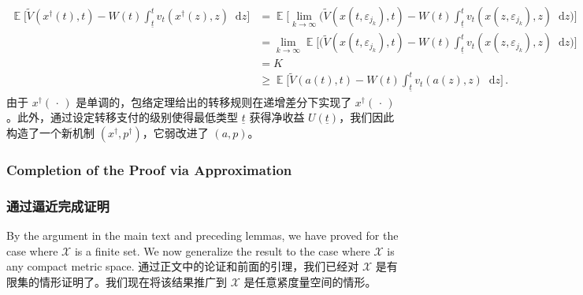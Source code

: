 \documentclass[12pt,letterpaper]{article}
\newenvironment{original}{\color{black}\noindent}{}
\newenvironment{translation}{\color{blue}\noindent}{}
\theoremstyle{plain}
\theoremstyle{definition}
\theoremstyle{remark}
\DeclareMathOperator{\E}{\mathds{E}}
\renewcommand{\1}{\mathds{1}}
\renewcommand*\d{\mathop{}\!\mathrm{d}}
\theoremstyle{definition}
\begin{document}
\begin{translation}
\begin{align*}
    \E\Bigg[\widetilde{V}(x^\dagger(t), t) - W(t) \int_{\underline{t}}^t v_t(x^\dagger(z), z) \d z \Bigg] &= \E\Bigg[\lim_{k\rightarrow \infty}\Big(\widetilde{V}(x(t, \varepsilon_{j_k}), t) - W(t) \int_{\underline{t}}^t v_t(x(z, \varepsilon_{j_k}), z) \d z \Big)\Bigg]\\
    &= \lim_{k\rightarrow \infty} \E\Bigg[\Big(\widetilde{V}(x(t, \varepsilon_{j_k}), t) - W(t) \int_{\underline{t}}^t v_t(x(z, \varepsilon_{j_k}), z) \d z \Big)\Bigg]\\
    & = K \\
    & \geq \E\Bigg[\widetilde{V}(a(t), t) - W(t) \int_{\underline{t}}^t v_t(a(z), z) \d z \Bigg]\,.
\end{align*}
由于 $x^\dagger(\,\cdot\,)$ 是单调的，包络定理给出的转移规则在递增差分下实现了 $x^\dagger(\,\cdot\,)$。此外，通过设定转移支付的级别使得最低类型 $\underline{t}$ 获得净收益 $U(\underline{t})$，我们因此构造了一个新机制 $(x^\dagger, p^\dagger)$，它弱改进了 $(a, p)$。
\end{translation}

\begin{original}
\subsubsection{Completion of the Proof via Approximation}\label{subsec:complete}
\end{original}
\begin{translation}
\subsubsection{通过逼近完成证明}\label{subsec:complete}
\end{translation}

\begin{original}
By the argument in the main text and preceding lemmas, we have proved  for the case where $\mathcal{X}$ is a finite set. We now generalize the result to the case where $\mathcal{X}$ is any compact metric space.
\end{original}
\begin{translation}
通过正文中的论证和前面的引理，我们已经对 $\mathcal{X}$ 是有限集的情形证明了。我们现在将该结果推广到 $\mathcal{X}$ 是任意紧度量空间的情形。
\end{translation}
\end{document}
